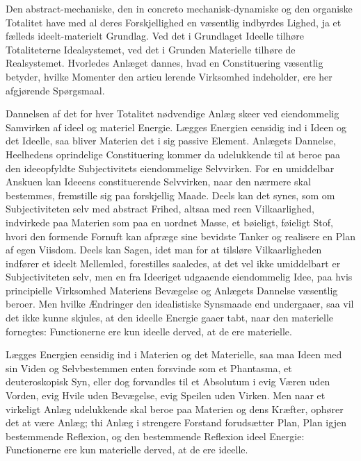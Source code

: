 \documentclass[12pt]{book}
\newcommand{\apage}[1]{\marginnote{\footnotesize\textit{[#1]}}}
\begin{document}
Den abstract-mechaniske, den in concreto mechanisk-dynamiske og den organiske Totalitet have med
al deres Forskjellighed en væsentlig indbyrdes Lighed, ja et fælleds ideelt-materielt Grundlag.
Ved det i Grundlaget Ideelle tilhøre Totaliteterne Idealsystemet, ved det i Grunden Materielle
tilhøre de Realsystemet. Hvorledes Anlæget dannes, hvad en Constituering væsentlig betyder,
hvilke Momenter den articu\-%
lerende \apage{397} Virksomhed indeholder, ere her afgjørende Spørgsmaal.

Dannelsen af det for hver Totalitet nødvendige Anlæg skeer ved eiendommelig Samvirken af ideel
og materiel Energie. Lægges Energien eensidig ind i Ideen og det Ideelle, saa bliver Materien
det i sig passive Element. Anlægets Dannelse, Heelhedens oprindelige Constituering kommer da
udelukkende til at beroe paa den ideeopfyldte Subjectivitets eiendommelige Selvvirken. For en
umiddelbar Anskuen kan Ideeens constituerende Selvvirken, naar den nærmere skal bestemmes,
fremstille sig paa forskjellig Maade. Deels kan det synes, som om Subjectiviteten selv med
abstract Frihed, altsaa med reen Vilkaarlighed, indvirkede paa Materien som paa en uordnet
Masse, et bøieligt, føieligt Stof, hvori den formende Fornuft kan afpræge sine bevidste Tanker
og realisere en Plan af egen Viisdom. Deels kan Sagen, idet man for at tilsløre Vilkaarligheden
indfører et ideelt Mellemled, forestilles saaledes, at det vel ikke umiddelbart er
Subjectiviteten selv, men en fra Ideeriget udgaaende eiendommelig Idee, paa hvis principielle
Virksomhed Materiens Bevægelse og Anlægets Dannelse væsentlig beroer. Men hvilke Ændringer den
idealistiske Synsmaade end undergaaer, saa vil det ikke kunne skjules, at den ideelle Energie
gaaer tabt, naar den materielle fornegtes: Functionerne ere kun ideelle derved, at de ere
materielle.

Lægges Energien eensidig ind i Materien og det Materielle, saa maa Ideen med sin Viden og
Selvbestemmen enten forsvinde som et Phantasma, et deuteroskopisk Syn, eller dog forvandles til
et Absolutum i evig Væren uden Vorden, evig Hvile uden Bevægelse, evig Speilen uden Virken. Men
naar et virkeligt Anlæg udelukkende skal beroe paa Materien og dens Kræfter, ophører det at være
Anlæg; thi Anlæg i strengere Forstand forudsætter Plan, Plan igjen bestemmende Reflexion, og den
bestemmende Reflexion ideel Energie: Functionerne ere kun materielle derved, at de ere ideelle.
\end{document}
